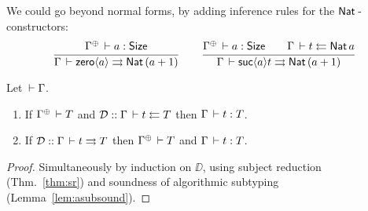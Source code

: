 \documentclass[acmlarge,review,anonymous]{acmart}\settopmatter{printfolios=true}
\begin{document}
We could go beyond normal forms, by adding inference rules for the $\mathsf{Nat}\,$-constructors:
\begin{gather*}
  \ru{\resurrect \Gamma \der a : \Size
    }{\Gamma \der \zero a \jinf \Nat(a+1)}
\qquad
  \ru{\resurrect \Gamma \der a : \Size \qquad
      \Gamma \der t \jchk \Nat a
    }{\Gamma \der \suc a t \jinf \Nat(a+1)}
\end{gather*}

\begin{theorem}
  Let $\,\vdash \Gamma$.
  \begin{enumerate}
  \item If $\resurrect\Gamma \der T$ and $\mathcal{D} :: \Gamma \,\vdash t \leftleftarrows T$ then $\Gamma \,\vdash t : T$.
  \item If $\mathcal{D} :: \Gamma \,\vdash t \rightrightarrows T$ then $\resurrect\Gamma \der T$ and $\Gamma \,\vdash t : T$.
  \end{enumerate}
\end{theorem}
\begin{proof}
  Simultaneously by induction on $\DD$, using subject reduction (Thm.~\ref{thm:sr})
  and soundness of algorithmic subtyping (Lemma~\ref{lem:asubsound}).
\end{proof}
\end{document}
